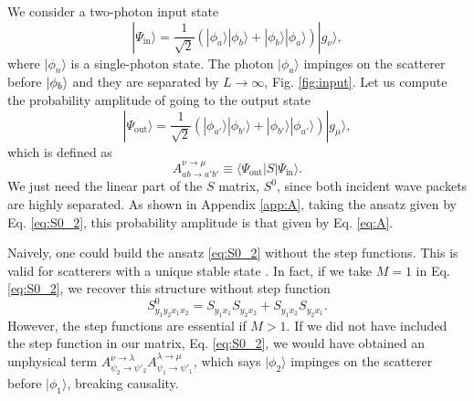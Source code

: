 \documentclass[notitlepage, prx, preprint, amsmath,superscriptaddress,amssymb]{revtex4-1}
\begin{document}
We consider a two-photon input state
\begin{equation}\label{eq:input}
|\Psi_\text{in}\rangle = \frac{1}{\sqrt{2}}(|\phi_a\rangle |\phi_b\rangle + |\phi_b\rangle |\phi_a\rangle)|g_\nu\rangle,
\end{equation}
where $|\phi_n\rangle$ is a single-photon state. The photon $|\phi_a\rangle$ impinges on the scatterer before $\ket{\phi_b}$ and they are separated by $L\to\infty$, Fig. \ref{fig:input}. Let us compute the probability amplitude of going to the output state
\begin{equation}\label{eq:output}
|\Psi_\text{out}\rangle = \frac{1}{\sqrt{2}}(|\phi_{a'}\rangle |\phi_{b'}\rangle + |\phi_{b'}\rangle |\phi_{a'}\rangle)|g_\mu\rangle,
\end{equation}
which is defined as
\begin{equation}\label{eq:A_def}
A_{ab\to a'b'}^{\nu\to\mu} \equiv \langle \Psi_\text{out}|S|\Psi_\text{in}\rangle.
\end{equation}
We just need the linear part of the $S$ matrix, $S^0$, since both incident wave packets are highly separated. As shown in Appendix \ref{app:A}, taking the ansatz given by Eq. \eqref{eq:S0_2}, this probability amplitude is that given by Eq. \eqref{eq:A}. %

Naively, one could build the ansatz \eqref{eq:S0_2} without the step functions. This is valid for scatterers with a unique stable state \cite{Xu2013}. In fact, if we take $M=1$ in Eq. \eqref{eq:S0_2}, we recover this structure without step function
\begin{equation}\label{eq:S0_2_1}
S^0_{y_1y_2x_1x_2} = S_{y_1x_1}S_{y_2x_2} + S_{y_1x_2}S_{y_2x_1}.
\end{equation}
However, the step functions are essential if $M>1$. If we did not have included the step function in our matrix, Eq. \eqref{eq:S0_2}, we would have obtained an unphysical term $A_{\psi_2\to \psi'_2}^{\nu\to\lambda} A_{\psi_1\to \psi'_1}^{\lambda\to\mu}$, which says $|\phi_2\rangle$ impinges on the scatterer before $|\phi_1\rangle$, breaking causality.
\end{document}
